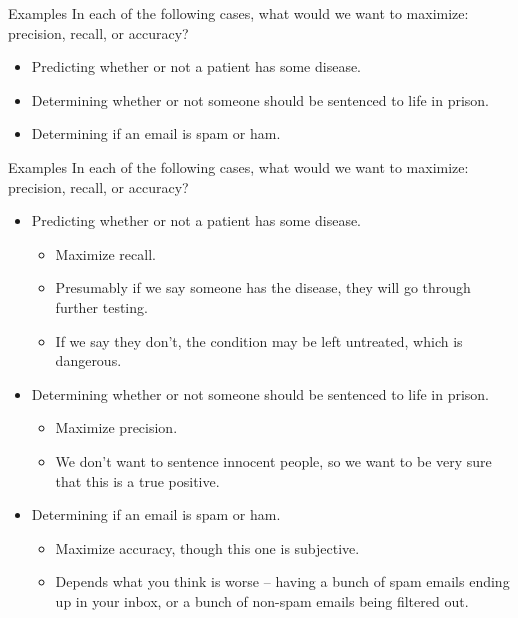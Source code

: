 \documentclass[aspectratio=169]{../latex_main/tntbeamer}  %
\begin{document}
	\begin{frame}{Examples}
	    In each of the following cases, what would we want to maximize: precision, recall, or accuracy?\\
	    \begin{itemize}
	        \item Predicting whether or not a patient has some disease.
	        \item Determining whether or not someone should be sentenced to life in prison.
	        \item  Determining if an email is spam or ham.
	    \end{itemize}
	\end{frame}
	
	
	\begin{frame}{Examples}
	    In each of the following cases, what would we want to maximize: precision, recall, or accuracy?\\
	    \begin{itemize}
	        \item Predicting whether or not a patient has some disease.
	        \begin{itemize}
	            \item Maximize recall.
	            \item Presumably if we say someone has the disease, they will go through further testing.
	            \item If we say they don’t, the condition may be left untreated, which is dangerous.
	        \end{itemize}
	        \item Determining whether or not someone should be sentenced to life in prison.
	        \begin{itemize}
	            \item Maximize precision.
	            \item We don’t want to sentence innocent people, so we want to be very sure that this is a true positive.
	        \end{itemize}
	        \item  Determining if an email is spam or ham.
	        \begin{itemize}
	            \item Maximize accuracy, though this one is subjective.
	            \item Depends what you think is worse – having a bunch of spam emails ending up in your inbox, or a bunch of non-spam emails being filtered out. 
	        \end{itemize}
	    \end{itemize}
	\end{frame}
\end{document}
